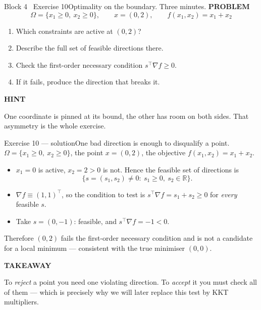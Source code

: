 \documentclass[aspectratio=169,11pt]{beamer}
\newcommand{\kicker}[1]{{\color{hseaccent}\scriptsize\bfseries\MakeUppercase{#1}}}
\newcommand{\takeaway}[2]{%
  \par\smallskip\noindent
  \colorbox{hselight}{\parbox{\dimexpr\textwidth-2\fboxsep}{%
    \kicker{#1}\par\vspace{0.12em}\footnotesize #2}}\par}
\begin{document}
\begin{frame}{Block 4 \textperiodcentered\ Exercise 10}{Optimality on the boundary. Three minutes.}
  \vspace{0.6em}
  \kicker{problem}
  \[ \Omega=\{x_1\ge0,\ x_2\ge0\},\qquad x=(0,2),\qquad f(x_1,x_2)=x_1+x_2 \]
  \vspace{-0.5em}
  \begin{enumerate}\small
    \item Which constraints are active at $(0,2)$?
    \item Describe the full set of feasible directions there.
    \item Check the first-order necessary condition $s^{\top}\nabla f\ge0$.
    \item If it fails, produce the direction that breaks it.
  \end{enumerate}
  \vspace{0.5em}
  \takeaway{hint}{One coordinate is pinned at its bound, the other has room on both sides. That asymmetry is
    the whole exercise.}
\end{frame}

\begin{frame}{Exercise 10 --- solution}{One bad direction is enough to disqualify a point.}
  \vspace{0.2em}
  $\Omega=\{x_1\ge 0,\ x_2\ge 0\}$, the point $x=(0,2)$, the objective $f(x_1,x_2)=x_1+x_2$.
  \vspace{0.5em}
  \begin{itemize}\small
    \item $x_1=0$ is active, $x_2=2>0$ is not. Hence the feasible set of directions is
          \[ \{s=(s_1,s_2)\neq 0:\ s_1\ge 0,\ s_2\in\mathbb{R}\}. \]
    \item $\nabla f\equiv(1,1)^{\top}$, so the condition to test is $s^{\top}\nabla f=s_1+s_2\ge 0$
          for \emph{every} feasible $s$.
    \item Take $s=(0,-1)$: feasible, and $s^{\top}\nabla f=-1<0$.
  \end{itemize}
  \vspace{0.4em}
  Therefore $(0,2)$ fails the first-order necessary condition and is not a candidate for a local minimum ---
  consistent with the true minimiser $(0,0)$.
  \vspace{0.5em}
  \takeaway{takeaway}{To \emph{reject} a point you need one violating direction. To \emph{accept} it you must
    check all of them --- which is precisely why we will later replace this test by KKT multipliers.}
\end{frame}
\end{document}
